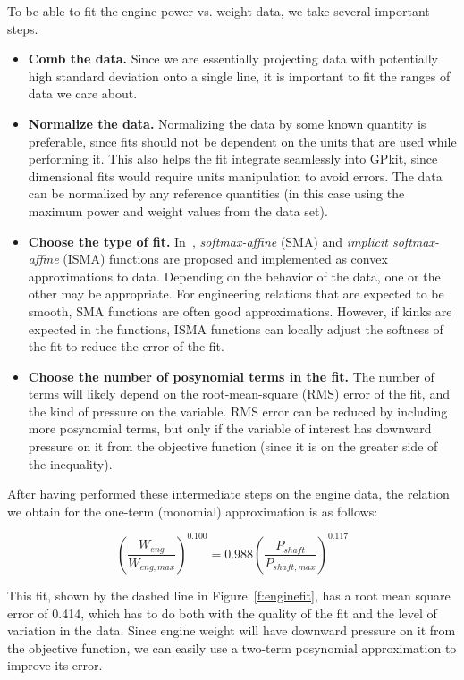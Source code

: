 To be able to fit the engine power vs. weight data, we take several important steps.
\begin{itemize}
    \item \textbf{Comb the data.} Since we are essentially projecting
    data with potentially high standard deviation onto a single line,
    it is important to fit the ranges of data we care about.
    \item \textbf{Normalize the data.} Normalizing the data
    by some known quantity is preferable, since fits should not be dependent on the
    units that are used while performing it. This also helps the fit integrate
    seamlessly into GPkit, since dimensional fits would require units manipulation
    to avoid errors. The data can be normalized by any
    reference quantities (in this case using the maximum power and weight values
    from the data set).
    \item \textbf{Choose the type of fit.} In~\cite{gpfitpaper}, \textit{softmax-affine}
    (SMA) and \textit{implicit softmax-affine} (ISMA)
    functions are proposed and implemented as convex approximations
    to data. Depending on the behavior of the data, one or the other
    may be appropriate. For engineering relations that are expected to be smooth, SMA
    functions are often good approximations. However, if kinks are expected in the
    functions, ISMA functions can locally adjust the softness of the fit to
    reduce the error of the fit.
    \item \textbf{Choose the number of posynomial terms in the fit.} The number of
    terms will likely depend on the root-mean-square (RMS) error of the fit, and
    the kind of pressure on the variable. RMS error can be reduced by including
    more posynomial terms, but only if the variable of interest has downward
    pressure on it from the objective function (since it is on the greater side
    of the inequality).
\end{itemize}

After having performed these intermediate steps on the engine data,
the relation we obtain for the one-term (monomial) approximation is as follows:

\begin{equation}
    \left(\frac{W_{eng}}{W_{eng,max}}\right)^{0.100} = 0.988 \left(\frac{P_{shaft}}{P_{shaft,max}}\right)^{0.117}
\end{equation}

This fit, shown by the dashed line in Figure~\ref{f:enginefit}, has a root mean square error of 0.414,
which has to do both with the quality of the fit and
the level of variation in the data. Since engine weight will have downward pressure
on it from the objective function, we can easily use a two-term posynomial approximation to
improve its error.

